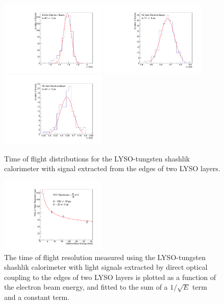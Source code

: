 \documentclass[12pt]{article}
\begin{document}
\begin{figure}[h] \centering
\includegraphics[width=0.45\textwidth]{figs/TOF_ShashlikSideReadout_Electron_8GeV} 
\includegraphics[width=0.45\textwidth]{figs/TOF_ShashlikSideReadout_Electron_16GeV} 
\includegraphics[width=0.45\textwidth]{figs/TOF_ShashlikSideReadout_Electron_32GeV} 
\caption{ Time of flight distributions for the LYSO-tungsten shashlik calorimeter
with signal extracted from the edges of two LYSO layers. } 
\label{fig:ShashlikSideReadoutTOF}
\end{figure}

\begin{figure}[h] \centering
\includegraphics[width=0.45\textwidth]{figs/TimeResolutionVsEnergy_ShashlikSideReadout} 
\caption{ The time of flight resolution measured using the LYSO-tungsten shashlik calorimeter
with light signals extracted by direct optical coupling to the edges of two LYSO layers 
is plotted as a function of the electron beam energy, and fitted to the sum 
of a $1/\sqrt{E}$ term and a constant term. }
\label{fig:ShashlikSideReadoutTOFResolutionVsEnergy}
\end{figure}
\end{document}
